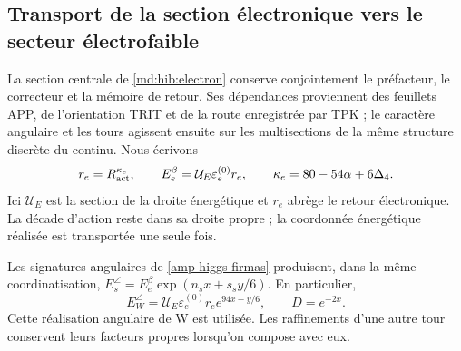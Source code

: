 \subsection{Transport de la section électronique vers le secteur électrofaible}
\label{amp-ew-seccion}

La section centrale de \eqref{md:hib:electron} conserve conjointement le
préfacteur, le correcteur et la mémoire de retour. Ses dépendances proviennent
des feuillets APP, de l’orientation TRIT et de la route enregistrée par TPK ;
le caractère angulaire et les tours agissent ensuite sur les multisections
de la même structure discrète du continu. Nous écrivons
\begin{equation}
 r_e=R_{\rm act}^{\kappa_e},\qquad
 E_e^\beta=\mathcal U_E\varepsilon_e^{(0)}r_e,\qquad
 \kappa_e=80-54\alpha+6\Delta_4.
 \label{amp-ew-electron}
\end{equation}
Ici $\mathcal U_E$ est la section de la droite énergétique et $r_e$ abrège
le retour électronique. La décade d’action reste dans sa droite propre ;
la coordonnée énergétique réalisée est transportée une seule fois.

Les signatures angulaires de \eqref{amp-higgs-firmas} produisent, dans la même
coordinatisation, $E_s^\angle=E_e^\beta\exp(n_sx+s_sy/6)$. En particulier,
\begin{equation}
 E_W^\angle=\mathcal U_E\varepsilon_e^{(0)}r_e
                  e^{94x-y/6},\qquad D=e^{-2x}.
 \label{amp-ew-w}
\end{equation}
Cette réalisation angulaire de W est utilisée. Les raffinements d’une autre tour
conservent leurs facteurs propres lorsqu’on compose avec eux.

